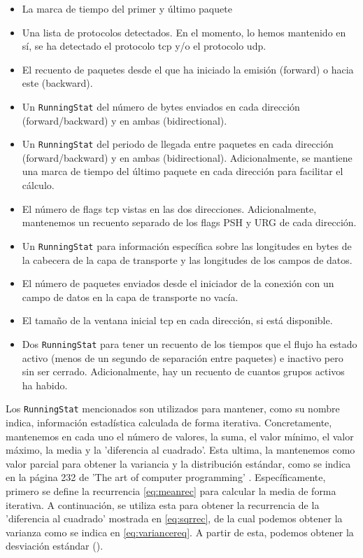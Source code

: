 \begin{itemize}
  \item La marca de tiempo del primer y último paquete
  \item Una lista de protocolos detectados. En el momento, lo hemos mantenido en sí, se ha detectado el protocolo \acrshort{tcp} y/o el protocolo \acrshort{udp}.
  \item El recuento de paquetes desde el que ha iniciado la emisión (forward) o hacia este (backward).
  \item Un \texttt{RunningStat} del número de bytes enviados en cada dirección (forward/backward) y en ambas (bidirectional).
  \item Un \texttt{RunningStat} del periodo de llegada entre paquetes en cada dirección (forward/backward) y en ambas (bidirectional). Adicionalmente, se mantiene una marca de tiempo del último paquete en cada dirección para facilitar el cálculo.
  \item El número de flags \acrshort{tcp} vistas en las dos direcciones. Adicionalmente, mantenemos un recuento separado de los flags PSH y URG de cada dirección.
  \item Un \texttt{RunningStat} para información específica sobre las longitudes en bytes de la cabecera de la capa de transporte y las longitudes de los campos de datos.
  \item El número de paquetes enviados desde el iniciador de la conexión con un campo de datos en la capa de transporte no vacía.
  \item El tamaño de la ventana inicial \acrshort{tcp} en cada dirección, si está disponible.
  \item Dos \texttt{RunningStat} para tener un recuento de los tiempos que el flujo ha estado activo (menos de un segundo de separación entre paquetes) e inactivo pero sin ser cerrado. Adicionalmente, hay un recuento de cuantos grupos activos ha habido.
\end{itemize}

Los \texttt{RunningStat} mencionados son utilizados para mantener, como su nombre indica, información estadística calculada de forma iterativa. Concretamente, mantenemos en cada uno el número de valores, la suma, el valor mínimo, el valor máximo, la media y la 'diferencia al cuadrado'. Esta ultima, la mantenemos como valor parcial para obtener la variancia y la distribución estándar, como se indica en la página 232 de 'The art of computer programming' \cite{10.5555/270146}. Específicamente, primero se define la recurrencia \ref{eq:meanrec} para calcular la media de forma iterativa. A continuación, se utiliza esta para obtener la recurrencia de la 'diferencia al cuadrado' mostrada en \ref{eq:sqrrec}, de la cual podemos obtener la varianza como se indica en \ref{eq:variancereq}. A partir de esta, podemos obtener la desviación estándar (\sigma).

